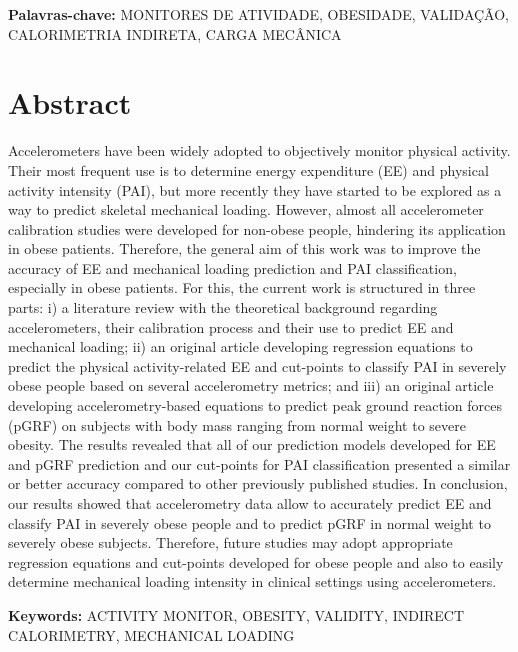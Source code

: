 \documentclass[12pt]{article}
\def\blankpage{%
      \clearpage%
      \thispagestyle{empty}%
      \addtocounter{page}{+0}%
      \null%
      \clearpage}
\begin{document}
\vspace{\fill}
\noindent
\textbf{Palavras-chave:} MONITORES DE ATIVIDADE, OBESIDADE, VALIDAÇÃO, CALORIMETRIA INDIRETA, CARGA MECÂNICA

\blankpage

\section*{\hfil Abstract \hfil}
\vspace{0.5em}

\noindent Accelerometers have been widely adopted to objectively monitor physical activity. Their most frequent use is to determine energy expenditure (EE) and physical activity intensity (PAI), but more recently they have started to be explored as a way to predict skeletal mechanical loading. However, almost all accelerometer calibration studies were developed for non-obese people, hindering its application in obese patients. Therefore, the general aim of this work was to improve the accuracy of EE and mechanical loading prediction and PAI classification, especially in obese patients. For this, the current work is structured in three parts: i) a literature review with the theoretical background regarding accelerometers, their calibration process and their use to predict EE and mechanical loading; ii) an original article developing regression equations to predict the physical activity-related EE and cut-points to classify PAI in severely obese people based on several accelerometry metrics; and iii) an original article developing accelerometry-based equations to predict peak ground reaction forces (pGRF) on subjects with body mass ranging from normal weight to severe obesity. The results revealed that all of our prediction models developed for EE and pGRF prediction and our cut-points for PAI classification presented a similar or better accuracy compared to other previously published studies. In conclusion, our results showed that accelerometry data allow to accurately predict EE and classify PAI in severely obese people and to predict pGRF in normal weight to severely obese subjects. Therefore, future studies may adopt appropriate regression equations and cut-points developed for obese people and also to easily determine mechanical loading intensity in clinical settings using accelerometers.

\vspace{\fill}
\noindent
\textbf{Keywords:} ACTIVITY MONITOR, OBESITY, VALIDITY, INDIRECT CALORIMETRY, MECHANICAL LOADING
\blankpage
\end{document}
